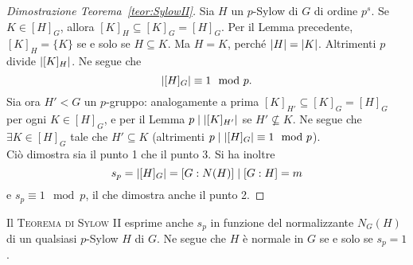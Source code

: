 \begin{proof}[Dimostrazione Teorema~\ref{teor:SylowII}]
Sia $H$ un $p$-Sylow di $G$ di ordine $p^s$. Se $K \in [H]_G$, allora $[K]_H \subseteq [K]_G=[H]_G$. Per il Lemma precedente, $[K]_H = \{K\}$ se e solo se $H \subseteq K$. Ma $H=K$, perché $\left\lvert H\right\rvert=\left\lvert K\right\rvert$. Altrimenti $p$ divide $\left\lvert[K]_H\right\rvert$. Ne segue che
\[ \left\lvert[H]_G\right\rvert \equiv 1 \mod p. \]
Sia ora $H'<G$ un $p$-gruppo: analogamente a prima $[K]_{H'}\subseteq[K]_G=[H]_G$ per ogni $K\in[H]_G$, e per il Lemma $p\mid\left\lvert[K]_{H'}\right\rvert$ se $H'\nsubseteq K$. Ne segue che $\exists K\in[H]_G$ tale che $H'\subseteq K$ (altrimenti $p\mid\left\lvert[H]_G\right\rvert\equiv1\mod p$). \\
Ci\`o dimostra sia il punto 1 che il punto 3. Si ha inoltre
\[
s_p=\left\lvert[H]_G\right\rvert=[G: N(H)]\mid[G:H]=m
\]
e $s_p\equiv1\mod p$, il che dimostra anche il punto 2.
\end{proof}



\begin{osse}
Il {\scshape Teorema di Sylow II} esprime anche $s_p$ in funzione del normalizzante $N_G(H)$ di un qualsiasi $p$-Sylow $H$ di $G$. Ne segue che $H$ è normale in $G$ se e solo se $s_p = 1$.
\end{osse}

